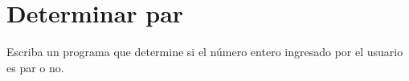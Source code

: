 \section{Determinar par}

Escriba un programa que determine si el número entero ingresado por el
usuario es par o no.
